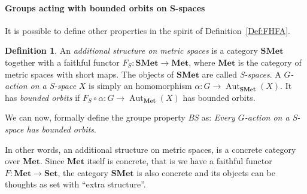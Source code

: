 \documentclass[a4paper]{article}
\theoremstyle{definition}
\newtheorem{defn}[lem]{Definition}
\DeclareMathOperator\Hom{Hom}
\DeclareMathOperator\Aut{Aut}
\begin{document}
\paragraph{Groups acting with bounded orbits on S-spaces}
It is possible to define other properties in the spirit of Definition~\ref{Def:FHFA}.
%
%
%
%
%
\begin{defn}\label{Def:Categoric}
An \emph{additional structure on metric spaces} is a category $\mathbf{SMet}$ together with a faithful functor $F_{S}\colon \mathbf{SMet}\to \mathbf{Met}$, where $\mathbf{Met}$ is the category of metric spaces with short maps.
The objects of $\mathbf{SMet}$ are called \emph{S-spaces}.
A \emph{$G$-action on a S-space} $X$ is simply an homomorphism $\alpha\colon G\to\Aut_{\mathbf{SMet}}(X)$. It has \emph{bounded orbits} if $F_S\circ \alpha\colon G\to \Aut_{\mathbf{Met}}(X)$ has bounded orbits.

We can now, formally define the groupe property \emph{BS} as: \emph{Every $G$-action on a S-space has bounded orbits}.
\end{defn}
%
%
In other words, an additional structure on metric spaces, is a concrete category over $\mathbf{Met}$. Since $\mathbf{Met}$ itself is concrete, that is we have a faithful functor $F\colon \mathbf{Met}\to\mathbf{Set}$, the category $\mathbf{SMet}$ is also concrete and its objects can be thoughts as set with ``extra structure''.
\end{document}
